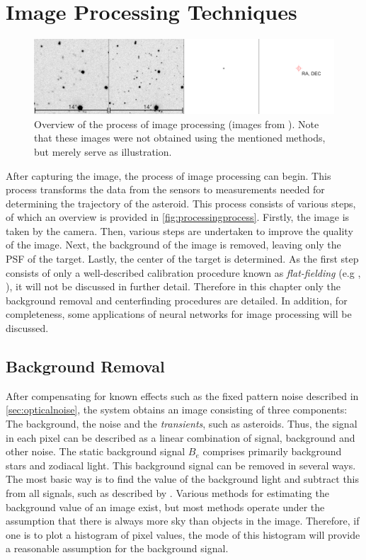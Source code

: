 \chapter{Image Processing Techniques}
\label{ch:imageprocessing}

\begin{figure}[htbp]
    \centering
    \includegraphics[width=1.0\textwidth]{images/processing.png}
    \caption{Overview of the process of image processing (images from \cite{ATLASBlog}). Note that these images were not obtained using the mentioned methods, but merely serve as illustration.}
    \label{fig:processingprocess}
\end{figure}

After capturing the image, the process of image processing can begin. This process transforms the data from the sensors to measurements needed for determining the trajectory of the asteroid. This process consists of various steps, of which an overview is provided in \autoref{fig:processingprocess}. Firstly, the image is taken by the camera. Then, various steps are undertaken to improve the quality of the image. Next, the background of the image is removed, leaving only the PSF of the target. Lastly, the center of the target is determined. As the first step consists of only a well-described calibration procedure known as \textit{flat-fielding} (e.g \cite{SMAD}, \cite{OpNav}), it will not be discussed in further detail. Therefore in this chapter only the background removal and centerfinding procedures are detailed. In addition, for completeness, some applications of neural networks for image processing will be discussed.

\section{Background Removal}
After compensating for known effects such as the fixed pattern noise described in \autoref{sec:opticalnoise}, the system obtains an image consisting of three components: The background, the noise and the \textit{transients}, such as asteroids. Thus, the signal in each pixel can be described as a linear combination of signal, background and other noise. The static background signal $B_e$ comprises primarily background stars and zodiacal light. This background signal can be removed in several ways. The most basic way is to find the value of the background light and subtract this from all signals, such as described by \cite{sextractor}. Various methods for estimating the background value of an image exist, but most methods operate under the assumption that there is always more sky than objects in the image. Therefore, if one is to plot a histogram of pixel values, the mode of this histogram will provide a reasonable assumption for the background signal.\\

